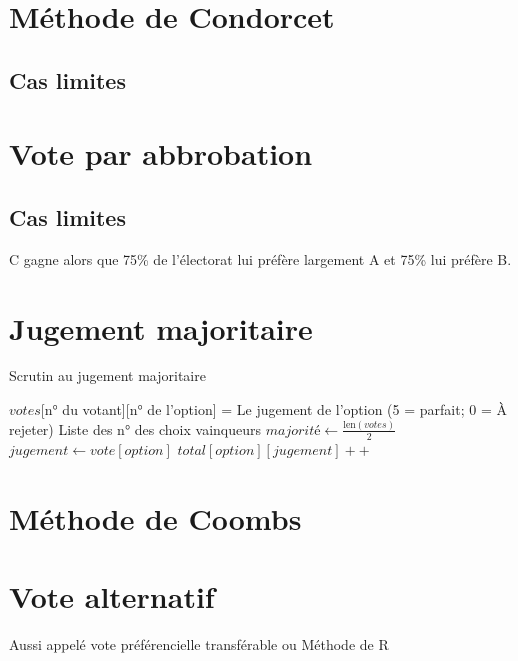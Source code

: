 \documentclass[../report]{subfiles}
\begin{document}
  \section{Méthode de Condorcet}
  \todo{}
  \subsection{Cas limites}
  \section{Vote par abbrobation}
  \todo{}
  
  \subsection{Cas limites}


  C gagne alors que 75\% de l'électorat lui préfère largement A et 75\% lui préfère B.

  \section{Jugement majoritaire}
  \todo{}
  
  \begin{algorithm}[H]
  \caption{Scrutin au jugement majoritaire}
  \label{scrutin:jugement-maj}
  \begin{algorithmic}[1]
  \REQUIRE $votes$[n° du votant][n° de l'option] = Le jugement de l'option (5 = parfait; 0 = À rejeter)
  \ENSURE Liste des n° des choix vainqueurs
  \STATE $majorité \leftarrow \frac{\text{len}(votes)}{2}$
      \STATE $jugement \leftarrow vote[option]$
      \STATE $total[option][jugement] ++$
    \ENDFOR
  \ENDFOR
  \end{algorithmic}
  \end{algorithm}
  
  \section{Méthode de Coombs}
  \todo{}
  \section{Vote alternatif}
  Aussi appelé vote préférencielle transférable ou Méthode de R
  \todo{}
\end{document}
